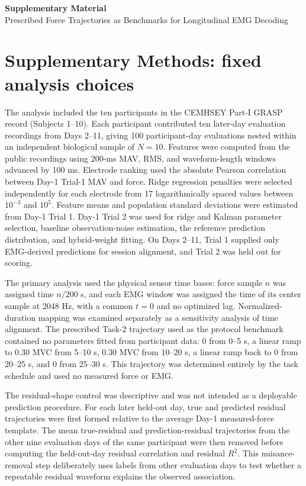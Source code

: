 \documentclass[preprint,12pt]{elsarticle}
\begin{document}
\begin{center}
{\Large\bfseries Supplementary Material}\\[0.6em]
{\large Prescribed Force Trajectories as Benchmarks for Longitudinal EMG Decoding}
\end{center}

\section*{Supplementary Methods: fixed analysis choices}

The analysis included the ten participants in the CEMHSEY Part-I GRASP record (Subjects 1--10). Each participant contributed ten later-day evaluation recordings from Days 2--11, giving 100 participant-day evaluations nested within an independent biological sample of $N=10$. Features were computed from the public recordings using 200-ms MAV, RMS, and waveform-length windows advanced by 100 ms. Electrode ranking used the absolute Pearson correlation between Day-1 Trial-1 MAV and force. Ridge regression penalties were selected independently for each electrode from 17 logarithmically spaced values between $10^{-3}$ and $10^5$. Feature means and population standard deviations were estimated from Day-1 Trial 1. Day-1 Trial 2 was used for ridge and Kalman parameter selection, baseline observation-noise estimation, the reference prediction distribution, and hybrid-weight fitting. On Days 2--11, Trial 1 supplied only EMG-derived predictions for session alignment, and Trial 2 was held out for scoring.

The primary analysis used the physical sensor time bases: force sample $n$ was assigned time $n/200$ s, and each EMG window was assigned the time of its center sample at 2048 Hz, with a common $t=0$ and no optimized lag. Normalized-duration mapping was examined separately as a sensitivity analysis of time alignment. The prescribed Task-2 trajectory used as the protocol benchmark contained no parameters fitted from participant data: 0 from 0--5 s, a linear ramp to 0.30 MVC from 5--10 s, 0.30 MVC from 10--20 s, a linear ramp back to 0 from 20--25 s, and 0 from 25--30 s. This trajectory was determined entirely by the task schedule and used no measured force or EMG.

The residual-shape control was descriptive and was not intended as a deployable prediction procedure. For each later held-out day, true and predicted residual trajectories were first formed relative to the average Day-1 measured-force template. The mean true-residual and prediction-residual trajectories from the other nine evaluation days of the same participant were then removed before computing the held-out-day residual correlation and residual $R^2$. This nuisance-removal step deliberately uses labels from other evaluation days to test whether a repeatable residual waveform explains the observed association.
\end{document}
